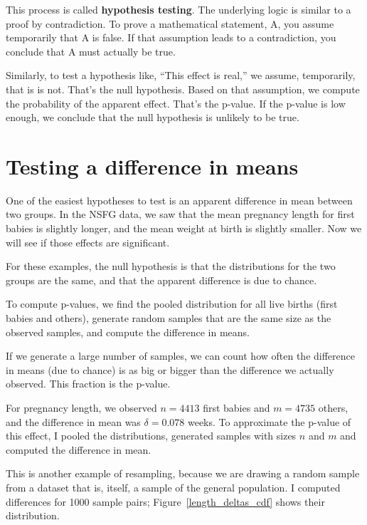 \documentclass[12pt]{book}
\begin{document}
This process is called {\bf hypothesis testing}.  The underlying
logic is similar to a proof by contradiction.  To prove a mathematical
statement, A, you assume temporarily that A is false.  If that
assumption leads to a contradiction, you conclude that A must actually
be true.

Similarly, to test a hypothesis like, ``This effect is real,'' we
assume, temporarily, that is is not.  That's the null hypothesis.
Based on that assumption, we compute the probability of the apparent
effect.  That's the p-value.  If the p-value is low enough, we
conclude that the null hypothesis is unlikely to be true.


\section{Testing a difference in means}

One of the easiest hypotheses to test is an apparent difference in mean
between two groups.  In the NSFG data, we saw that the mean pregnancy
length for first babies is slightly longer, and the mean weight at
birth is slightly smaller.  Now we will see if those effects are
significant.

For these examples, the null hypothesis is that the distributions
for the two groups are the same, and that the apparent difference is
due to chance.

To compute p-values, we find the pooled distribution for all live
births (first babies and others), generate random samples that are
the same size as the observed samples, and compute the difference
in means.

If we generate a large number of samples, we can count how often the
difference in means (due to chance) is as big or bigger than the
difference we actually observed.  This fraction is the p-value.

For pregnancy length, we observed $n = 4413$ first babies and $m = 4735$
others, and the difference in mean was $\delta = 0.078$ weeks.  To
approximate the p-value of this effect, I pooled the distributions,
generated samples with sizes $n$ and $m$ and computed the difference
in mean.

This is another example of resampling, because we are drawing a
random sample from a dataset that is, itself, a sample of the general
population.  I computed differences for 1000 sample pairs;
Figure~\ref{length_deltas_cdf} shows their distribution.
\end{document}
